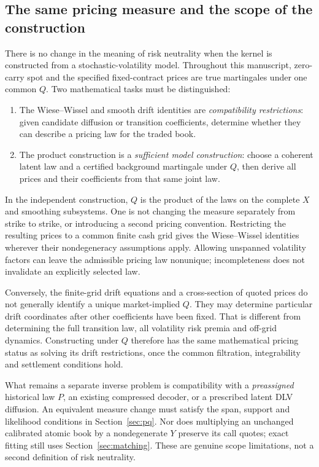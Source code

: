 \documentclass[11pt,a4paper]{article}
\numberwithin{equation}{section}
\theoremstyle{definition}\newtheorem{definition}[theorem]{Definition}
\theoremstyle{remark}\newtheorem{remark}[theorem]{Remark}
\begin{document}
\subsection{The same pricing measure and the scope of the construction}
\label{sec:sv-same-q}
There is no change in the meaning of risk neutrality when the kernel is constructed from a stochastic-volatility model. Throughout this manuscript, zero-carry spot and the specified fixed-contract prices are true martingales under one common $Q$. Two mathematical tasks must be distinguished:
\begin{enumerate}
\item The Wiese--Wissel and smooth drift identities are \emph{compatibility restrictions}: given candidate diffusion or transition coefficients, determine whether they can describe a pricing law for the traded book.
\item The product construction is a \emph{sufficient model construction}: choose a coherent latent law and a certified background martingale under $Q$, then derive all prices and their coefficients from that same joint law.
\end{enumerate}
In the independent construction, $Q$ is the product of the laws on the complete $X$ and smoothing subsystems. One is not changing the measure separately from strike to strike, or introducing a second pricing convention. Restricting the resulting prices to a common finite cash grid gives the Wiese--Wissel identities wherever their nondegeneracy assumptions apply. Allowing unspanned volatility factors can leave the admissible pricing law nonunique; incompleteness does not invalidate an explicitly selected law.

Conversely, the finite-grid drift equations and a cross-section of quoted prices do not generally identify a unique market-implied $Q$. They may determine particular drift coordinates after other coefficients have been fixed. That is different from determining the full transition law, all volatility risk premia and off-grid dynamics. Constructing under $Q$ therefore has the same mathematical pricing status as solving its drift restrictions, once the common filtration, integrability and settlement conditions hold.

What remains a separate inverse problem is compatibility with a \emph{preassigned} historical law $P$, an existing compressed decoder, or a prescribed latent DLV diffusion. An equivalent measure change must satisfy the span, support and likelihood conditions in Section~\ref{sec:pq}. Nor does multiplying an unchanged calibrated atomic book by a nondegenerate $Y$ preserve its call quotes; exact fitting still uses Section~\ref{sec:matching}. These are genuine scope limitations, not a second definition of risk neutrality.
\end{document}
